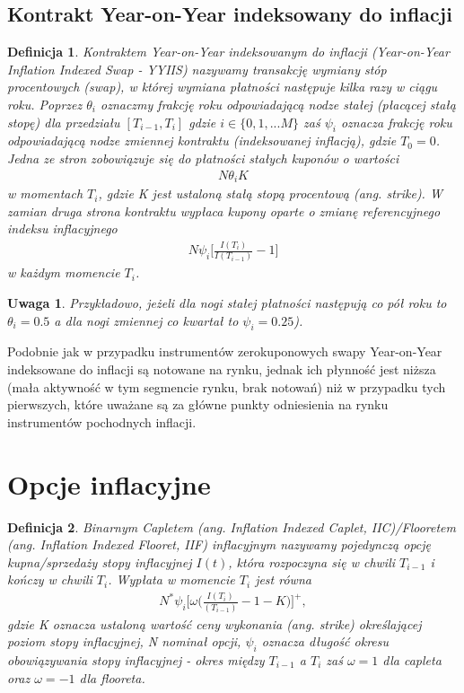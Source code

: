\documentclass{mini}
\theoremstyle{mythstyle}
\newtheorem{Definicja}{Definicja}[chapter]
\newtheorem{Uwaga}{Uwaga}[chapter]
\begin{document}
	\subsection{Kontrakt Year-on-Year indeksowany do inflacji }
		
	\begin{Definicja}
	Kontraktem Year-on-Year indeksowanym do inflacji (Year-on-Year Inflation Indexed Swap - YYIIS) nazywamy transakcję wymiany stóp procentowych (swap), w której wymiana płatności następuje kilka razy w ciągu roku. Poprzez $\theta_i$ oznaczmy frakcję roku odpowiadającą nodze stałej (płacącej stałą stopę) dla przedziału $[T_{i-1},T_i]$ gdzie $i \in \{0, 1, ... M\}$ zaś $\psi_i$ oznacza frakcję roku odpowiadającą nodze zmiennej kontraktu (indeksowanej inflacją), gdzie $T_0 = 0$. Jedna ze stron zobowiązuje się do płatności stałych kuponów o wartości
	\begin{eqnarray*}
		N\theta_i K
	\end{eqnarray*}
	w momentach  $T_i$, gdzie K jest ustaloną stałą stopą procentową (ang. strike). W zamian druga strona kontraktu wypłaca kupony oparte o zmianę referencyjnego indeksu inflacyjnego
	\begin{eqnarray*}
		N\psi_i\bigg[\frac{I(T_i)}{I(T_{i-1})} - 1\bigg]
	\end{eqnarray*}
	w każdym momencie $T_i$. \\
	\end{Definicja}
	
	\begin{Uwaga}
		Przykładowo, jeżeli dla nogi stałej płatności następują co pół roku to $\theta_i = 0.5$ a dla nogi zmiennej co kwartał to $\psi_i = 0.25$). 
	\end{Uwaga}

	Podobnie jak w przypadku instrumentów zerokuponowych swapy Year-on-Year indeksowane do inflacji są notowane na rynku, jednak ich płynność jest niższa (mała aktywność w tym segmencie rynku, brak notowań) niż w przypadku tych pierwszych, które uważane są za główne punkty odniesienia na rynku instrumentów pochodnych inflacji.
		
	\section{Opcje inflacyjne}
		
	\begin{Definicja}
			Binarnym Capletem (ang. Inflation Indexed Caplet, IIC)/Flooretem (ang. Inflation Indexed Flooret, IIF) inflacyjnym nazywamy pojedynczą opcję kupna/sprzedaży stopy inflacyjnej $I(t)$, która rozpoczyna się w chwili $T_{i-1}$ i kończy w chwili $T_i$.
			Wypłata w momencie $T_i$ jest równa
			\begin{eqnarray*}
				N^{*}\psi_i\bigg[\omega\bigg(\frac{I(T_i)}{(T_{i-1})} - 1 - K \bigg)\bigg]^{+},
			\end{eqnarray*}
			gdzie K oznacza ustaloną wartość ceny wykonania (ang. strike) określającej poziom stopy inflacyjnej, N nominał opcji, $\psi_i$ oznacza długość okresu obowiązywania stopy inflacyjnej - okres między  $T_{i-1}$ a $T_i$ zaś $\omega = 1$ dla capleta oraz $\omega = -1$ dla flooreta.
	\end{Definicja}
	
\end{document}
